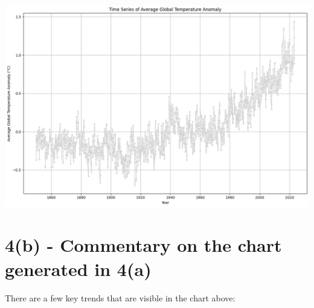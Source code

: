 \documentclass[
  letterpaper,
  DIV=11,
  numbers=noendperiod]{scrartcl}
\begin{document}
\includegraphics{Assignment-1_ICP_files/figure-pdf/cell-12-output-1.png}

\section{4(b) - Commentary on the chart generated in
4(a)}\label{b---commentary-on-the-chart-generated-in-4a}

There are a few key trends that are visible in the chart above:
\end{document}
